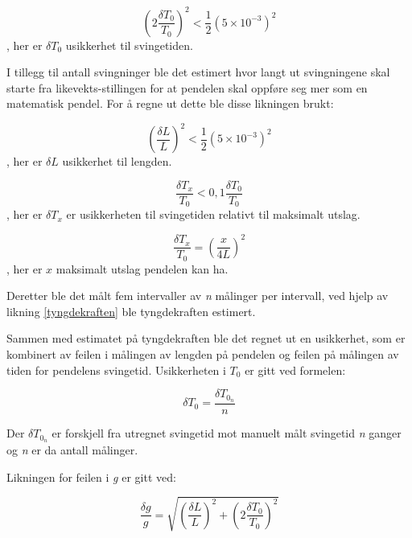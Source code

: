 \documentclass[twocolumn, 11pt]{article} %
\begin{document}
\begin{equation}
    \left(2\frac{\delta T_0}{T_0}\right)^2 < \frac{1}{2} (5 \times 10^{-3})^2
    \label{delta_T_0}
\end{equation}
, her er \textit{$\delta T_0$} usikkerhet til svingetiden.

I tillegg til antall svingninger ble det estimert hvor langt ut svingningene skal starte fra likevekts-stillingen for at pendelen skal oppføre seg mer som en matematisk pendel. For å regne ut dette ble disse likningen brukt:

\begin{equation}
    \left(\frac{\delta L}{L}\right)^2 < \frac{1}{2} (5 \times 10^{-3})^2
    \label{delta_L}
\end{equation}
, her er \textit{$\delta L$} usikkerhet til lengden. 

\begin{equation}
    \frac{\delta T_{x}}{T_0} < 0,1\frac{\delta T_0}{T_0}
    \label{delta_T_x}
\end{equation}
, her er \textit{$\delta T_{x}$} er usikkerheten til svingetiden relativt til maksimalt utslag.

\begin{equation}
    \frac{\delta T_{x}}{T_0} = \left(\frac{x}{4L}\right)^2
    \label{formula_x}
\end{equation}
, her er \textit{$x$} maksimalt utslag pendelen kan ha.

Deretter ble det målt fem intervaller av \textit{n} målinger per intervall, ved hjelp av likning \eqref{tyngdekraften} ble tyngdekraften estimert.

Sammen med estimatet på tyngdekraften ble det regnet ut en usikkerhet, som er kombinert av feilen i målingen av lengden på pendelen og feilen på målingen av tiden for pendelens svingetid. Usikkerheten i \textit{$T_0$} er gitt ved formelen:

\begin{equation}
    \delta T_0 =  \frac{\delta T_{0_n}}{n}
    \label{formula_n}
\end{equation}

Der \textit{$\delta T_{0_n}$} er forskjell fra utregnet svingetid mot manuelt målt svingetid \textit{n} ganger og \textit{n} er da antall målinger.

Likningen for feilen i \textit{g} er gitt ved:

\begin{equation}
    \frac{\delta g}{g} = \sqrt{\left(\frac{\delta L}{L}\right)^2 + \left(2\frac{\delta T_0}{T_0}\right)^2}
    \label{delta_g}
\end{equation}
\end{document}

